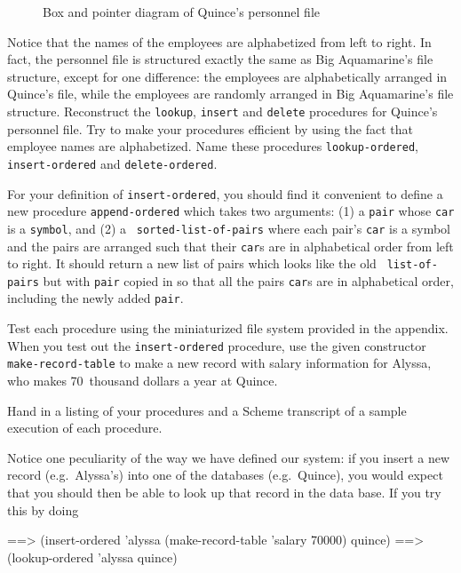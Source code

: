 \begin{figure}[hbt]
\begin{center}
\mbox{}
\end{center}
\caption{Box and pointer diagram of Quince's personnel file}\label{fig:box-n-ptr}
\end{figure}

Notice that the names of the employees are alphabetized from
left to right.  In fact, the personnel file is structured
exactly the same as Big Aquamarine's file structure, except
for one difference: the employees are alphabetically
arranged in Quince's file, while the employees
are randomly arranged in Big Aquamarine's file structure.
Reconstruct the {\tt lookup}, {\tt insert} and {\tt delete} procedures for
Quince's personnel file.  Try to make your procedures
efficient by using the fact that employee names are alphabetized.
Name these procedures {\tt lookup-ordered}, {\tt insert-ordered} and
{\tt delete-ordered}.

For your definition of {\tt insert-ordered}, you should find it convenient to
define a new procedure {\tt append-ordered} which takes two arguments: (1) a
{\tt pair} whose {\tt car} is a {\tt symbol}, and (2) a {\tt
sorted-list-of-pairs} where each pair's {\tt car} is a symbol and the pairs are
arranged such that their {\tt car}s are in alphabetical order from left to
right.  It should return a new list of pairs which looks like the old {\tt
list-of-pairs} but with {\tt pair} copied in so that all the pairs {\tt car}s
are in alphabetical order, including the newly added {\tt pair}.

Test each procedure using the miniaturized file
system provided in the appendix.
When you test out the {\tt insert-ordered}
procedure, use the given constructor {\tt make-record-table} to make a
new record with salary information for Alyssa, who makes 70~thousand
dollars a year at Quince.

Hand in a listing of your procedures and a {\sc Scheme} transcript of
a sample execution of each procedure.

Notice one peculiarity of the way we have defined our system:
if you insert a new record (e.g.~Alyssa's) into one
of the databases (e.g.~Quince), you would expect that you should then
be able to look up that record in the data base.  If you try this by
doing

\beginlisp
==> (insert-ordered 'alyssa (make-record-table 'salary 70000) quince)
==> (lookup-ordered 'alyssa quince)
\endlisp

